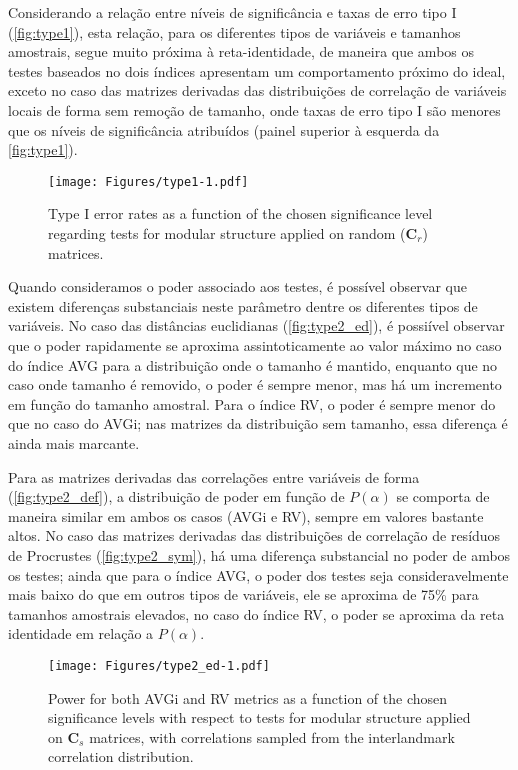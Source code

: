 \documentclass[12pt,]{article}
\begin{document}
Considerando a relação entre níveis de significância e taxas de erro
tipo I (\autoref{fig:type1}), esta relação, para os diferentes tipos de
variáveis e tamanhos amostrais, segue muito próxima à reta-identidade,
de maneira que ambos os testes baseados no dois índices apresentam um
comportamento próximo do ideal, exceto no caso das matrizes derivadas
das distribuições de correlação de variáveis locais de forma sem remoção
de tamanho, onde taxas de erro tipo I são menores que os níveis de
significância atribuídos (painel superior à esquerda da
\autoref{fig:type1}).

\begin{figure}[htbp]
\centering
\texttt{[image: Figures/type1-1.pdf]}
\caption{Type I error rates as a function of the chosen significance
level regarding tests for modular structure applied on random
($\mathbf{C}_r$) matrices. \label{fig:type1}}
\end{figure}

Quando consideramos o poder associado aos testes, é possível observar
que existem diferenças substanciais neste parâmetro dentre os diferentes
tipos de variáveis. No caso das distâncias euclidianas
(\autoref{fig:type2_ed}), é possiível observar que o poder rapidamente
se aproxima assintoticamente ao valor máximo no caso do índice AVG para
a distribuição onde o tamanho é mantido, enquanto que no caso onde
tamanho é removido, o poder é sempre menor, mas há um incremento em
função do tamanho amostral. Para o índice RV, o poder é sempre menor do
que no caso do AVGi; nas matrizes da distribuição sem tamanho, essa
diferença é ainda mais marcante.

Para as matrizes derivadas das correlações entre variáveis de forma
(\autoref{fig:type2_def}), a distribuição de poder em função de
$P(\alpha)$ se comporta de maneira similar em ambos os casos (AVGi e
RV), sempre em valores bastante altos. No caso das matrizes derivadas
das distribuições de correlação de resíduos de Procrustes
(\autoref{fig:type2_sym}), há uma diferença substancial no poder de
ambos os testes; ainda que para o índice AVG, o poder dos testes seja
consideravelmente mais baixo do que em outros tipos de variáveis, ele se
aproxima de 75\% para tamanhos amostrais elevados, no caso do índice RV,
o poder se aproxima da reta identidade em relação a $P(\alpha)$.

\begin{figure}[htbp]
\centering
\texttt{[image: Figures/type2\_ed-1.pdf]}
\caption{Power for both AVGi and RV metrics as a function of the chosen
significance levels with respect to tests for modular structure applied
on $\mathbf{C}_s$ matrices, with correlations sampled from the
interlandmark correlation distribution. \label{fig:type2_ed}}
\end{figure}
\end{document}
